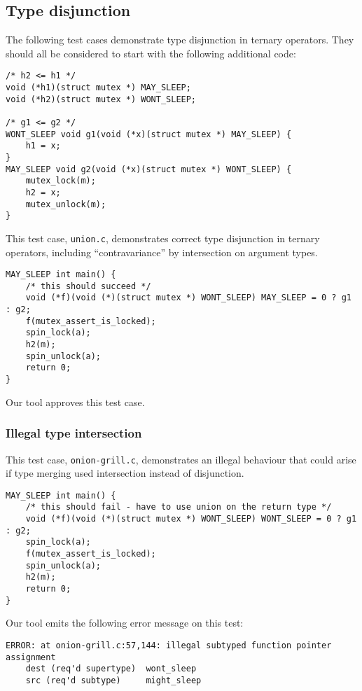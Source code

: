 \documentclass{article}
\begin{document}
\subsection{Type disjunction}

The following test cases demonstrate type disjunction in ternary operators. They should all be considered to start with the following additional code:

\begin{verbatim}
/* h2 <= h1 */
void (*h1)(struct mutex *) MAY_SLEEP;
void (*h2)(struct mutex *) WONT_SLEEP;

/* g1 <= g2 */
WONT_SLEEP void g1(void (*x)(struct mutex *) MAY_SLEEP) {
    h1 = x;
}
MAY_SLEEP void g2(void (*x)(struct mutex *) WONT_SLEEP) {
    mutex_lock(m);
    h2 = x;
    mutex_unlock(m);
}
\end{verbatim}

This test case, \texttt{union.c}, demonstrates correct type disjunction in ternary operators, including ``contravariance'' by intersection on argument types.

\begin{verbatim}
MAY_SLEEP int main() {
    /* this should succeed */
    void (*f)(void (*)(struct mutex *) WONT_SLEEP) MAY_SLEEP = 0 ? g1 : g2;
    f(mutex_assert_is_locked);
    spin_lock(a);
    h2(m);
    spin_unlock(a);
    return 0;
}
\end{verbatim}

Our tool approves this test case.

\subsubsection{Illegal type intersection}

This test case, \texttt{onion-grill.c}, demonstrates an illegal behaviour that could arise if type merging used intersection instead of disjunction.

\begin{verbatim}
MAY_SLEEP int main() {
    /* this should fail - have to use union on the return type */
    void (*f)(void (*)(struct mutex *) WONT_SLEEP) WONT_SLEEP = 0 ? g1 : g2;
    spin_lock(a);
    f(mutex_assert_is_locked);
    spin_unlock(a);
    h2(m);
    return 0;
}
\end{verbatim}

Our tool emits the following error message on this test:
\begin{verbatim}
ERROR: at onion-grill.c:57,144: illegal subtyped function pointer assignment
    dest (req'd supertype)  wont_sleep
    src (req'd subtype)     might_sleep
\end{verbatim}
\end{document}
